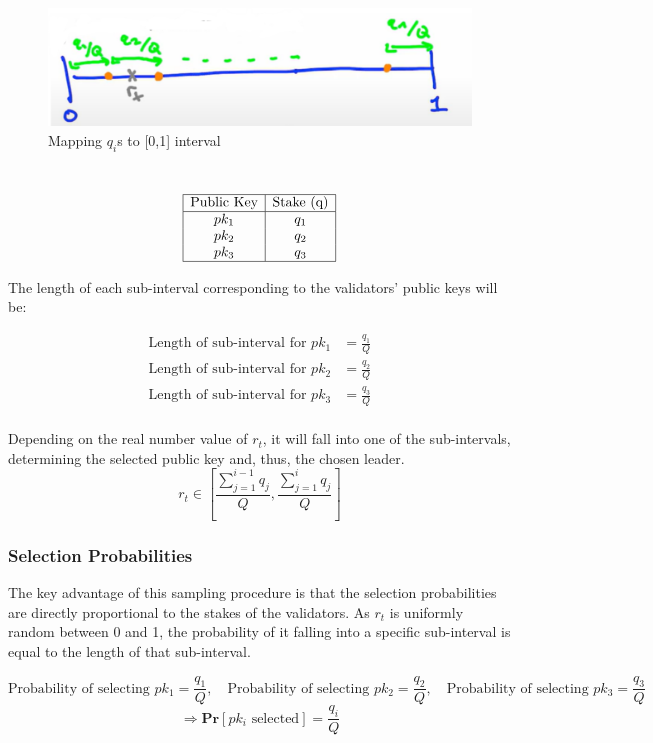 \begin{figure}[h]
    \centering
    \includegraphics[scale = 0.5]{figures/f51.png}
    \caption{Mapping $q_i$s to [0,1] interval}
    \label{fig:mesh1}
\end{figure}\\
$$
\begin{array}{|c|c|}
\hline
\text{Public Key} & \text{Stake (q)} \\
\hline
pk_1 & q_1 \\
pk_2 & q_2 \\
pk_3 & q_3 \\
\hline
\end{array}
$$

The length of each sub-interval corresponding to the validators' public keys will be:

$$
\begin{aligned}
\text{Length of sub-interval for } pk_1 &= \frac{q_1}{Q} \\
\text{Length of sub-interval for } pk_2 &= \frac{q_2}{Q} \\
\text{Length of sub-interval for } pk_3 &= \frac{q_3}{Q} \\
\end{aligned}
$$

Depending on the real number value of $r_t$, it will fall into one of the sub-intervals, determining the selected public key and, thus, the chosen leader.
$$r_t \in \left[\frac{\sum_{j=1}^{i-1} q_j}{Q}, \frac{\sum_{j=1}^{i} q_j}{Q} \right]$$
\subsubsection{Selection Probabilities}
The key advantage of this sampling procedure is that the selection probabilities are directly proportional to the stakes of the validators. As $r_t$ is uniformly random between 0 and 1, the probability of it falling into a specific sub-interval is equal to the length of that sub-interval.

$$
\text{Probability of selecting } pk_1 = \frac{q_1}{Q}, \quad \text{Probability of selecting } pk_2 = \frac{q_2}{Q}, \quad \text{Probability of selecting } pk_3 = \frac{q_3}{Q}
$$
$$\Rightarrow \textbf{Pr}[\text{$pk_i$ selected}] = \frac{q_i}{Q}$$

